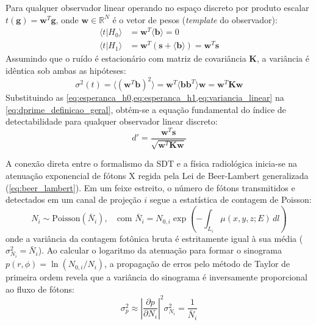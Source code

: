 \documentclass[
  12pt,
  a4paper,
  oneside
]{report}
\begin{document}
Para qualquer observador linear operando no espaço discreto por produto escalar $t(\mathbf{g}) = \mathbf{w}^T \mathbf{g}$, onde $\mathbf{w} \in \mathbb{R}^N$ é o vetor de pesos (\emph{template} do observador):
\begin{align}
  \langle t | H_0 \rangle &= \mathbf{w}^T \langle \mathbf{b} \rangle = 0 \label{eq:esperanca_h0} \\
  \langle t | H_1 \rangle &= \mathbf{w}^T (\mathbf{s} + \langle \mathbf{b} \rangle) = \mathbf{w}^T \mathbf{s} \label{eq:esperanca_h1}
\end{align}
Assumindo que o ruído é estacionário com matriz de covariância $\mathbf{K}$, a variância é idêntica sob ambas as hipóteses:
\begin{equation}
  \sigma^2(t) = \langle (\mathbf{w}^T \mathbf{b})^2 \rangle = \mathbf{w}^T \langle \mathbf{b} \mathbf{b}^T \rangle \mathbf{w} = \mathbf{w}^T \mathbf{K} \mathbf{w}
  \label{eq:variancia_linear}
\end{equation}
Substituindo as \cref{eq:esperanca_h0,eq:esperanca_h1,eq:variancia_linear} na \cref{eq:dprime_definicao_geral}, obtém-se a equação fundamental do índice de detectabilidade para qualquer observador linear discreto:
\begin{equation}
  d' = \frac{\mathbf{w}^T \mathbf{s}}{\sqrt{\mathbf{w}^T \mathbf{K} \mathbf{w}}}
  \label{eq:dprime_linear_fundamental}
\end{equation}

A conexão direta entre o formalismo da SDT e a física radiológica inicia-se na atenuação exponencial de fótons X regida pela Lei de Beer-Lambert generalizada (\cref{eq:beer_lambert}). Em um feixe estreito, o número de fótons transmitidos e detectados em um canal de projeção $i$ segue a estatística de contagem de Poisson:
\begin{equation}
  N_i \sim \text{Poisson}(\bar{N}_i), \quad \text{com } \bar{N}_i = N_{0,i} \exp\left(-\int_{L_i} \mu(x,y,z; E) \, dl\right)
  \label{eq:poisson_transmissao}
\end{equation}
onde a variância da contagem fotônica bruta é estritamente igual à sua média ($\sigma_{N_i}^2 = \bar{N}_i$). Ao calcular o logaritmo da atenuação para formar o sinograma $p(r, \phi) = \ln(N_{0,i} / N_i)$, a propagação de erros pelo método de Taylor de primeira ordem revela que a variância do sinograma é inversamente proporcional ao fluxo de fótons:
\begin{equation}
  \sigma_p^2 \approx \left| \frac{\partial p}{\partial N_i} \right|^2 \sigma_{N_i}^2 = \frac{1}{\bar{N}_i}
  \label{eq:variancia_sinograma}
\end{equation}
\end{document}
